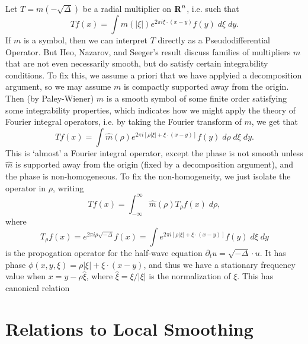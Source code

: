 Let $T = m(-\sqrt{\Delta})$ be a radial multiplier on $\operatorname{\mathbf{R}}^n$, i.e. such that
%
\[ T f(x) = \int m(|\xi|) e^{2 \pi i \xi \cdot (x - y)} f(y)\; d\xi\; dy. \]
%
If $m$ is a symbol, then we can interpret $T$ directly as a Pseudodifferential Operator. But Heo, Nazarov, and Seeger's result discuss families of multipliers $m$ that are not even necessarily smooth, but do satisfy certain integrability conditions. To fix this, we assume a priori that we have applyied a decomposition argument, so we may assume $m$ is compactly supported away from the origin. Then (by Paley-Wiener) $\widehat{m}$ is a smooth symbol of some finite order satisfying some integrability properties, which indicates how we might apply the theory of Fourier integral operators, i.e. by taking the Fourier transform of $m$, we get that
%
\[ Tf(x) = \int \widehat{m}(\rho) e^{2 \pi i [\rho |\xi| + \xi \cdot (x-y)]} f(y)\; d\rho\; d\xi\; dy. \]
%
This is `almost' a Fourier integral operator, except the phase is not smooth unless $\widehat{m}$ is supported away from the origin (fixed by a decomposition argument), and the phase is non-homogeneous. To fix the non-homogeneity, we just isolate the operator in $\rho$, writing
%
\[ Tf(x) = \int_{-\infty}^\infty \widehat{m}(\rho) T_\rho f(x)\; d\rho, \]
%
where
%
\[ T_\rho f(x) = e^{2 \pi i \rho \sqrt{-\Delta}} f(x) = \int e^{2 \pi i [\rho |\xi| + \xi \cdot (x - y)]} f(y)\; d\xi\; dy \]
%
is the propogation operator for the half-wave equation $\partial_t u = \sqrt{-\Delta} \cdot u$. It has phase $\phi(x,y,\xi) = \rho |\xi| + \xi \cdot (x - y)$, and thus we have a stationary frequency value when $x = y - \rho \widehat{\xi}$, where $\widehat{\xi} = \xi / |\xi|$ is the normalization of $\xi$. This has canonical relation




\chapter{Relations to Local Smoothing}

